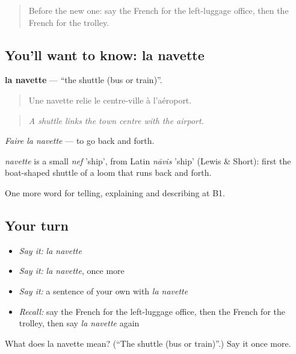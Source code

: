 \label{lesson:FR-C414-navette}



\begin{quote}
Before the new one: say the French for the left-luggage office, then the French for the trolley.
\end{quote}

\subsection*{You'll want to know: la navette}
\textbf{la navette} — \textquotedblleft{}the shuttle (bus or train)\textquotedblright{}.

\begin{quote}
Une navette relie le centre-ville à l'aéroport.
\end{quote}

\begin{quote}
\emph{A shuttle links the town centre with the airport.}
\end{quote}

\emph{Faire la navette} — to go back and forth.

\begin{cousinweb}
\emph{navette} is a small \emph{nef} 'ship', from Latin \emph{nāvis} 'ship' (Lewis \& Short): first the boat-shaped shuttle of a loom that runs back and forth.
\end{cousinweb}

\begin{grammarlens}[title={What you've built}]
One more word for telling, explaining and describing at B1.
\end{grammarlens}

\subsection*{Your turn}
\begin{itemize}
\raggedright
  \item \emph{Say it:} \emph{la navette}
  \item \emph{Say it:} \emph{la navette}, once more
  \item \emph{Say it:} a sentence of your own with \emph{la navette}
  \item \emph{Recall:} say the French for the left-luggage office, then the French for the trolley, then say \emph{la navette} again
\end{itemize}

\begin{tcolorbox}[breakable,colback=teal!4,colframe=teal!35!black,title={Before you move on}]
What does la navette mean? (\textquotedblleft{}The shuttle (bus or train)\textquotedblright{}.) Say it once more.
\end{tcolorbox}

